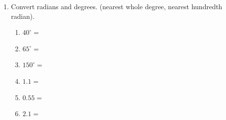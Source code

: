 \documentclass[12pt, twoside]{article}
\begin{document}
\begin{enumerate}
\item Convert radians and degrees. (nearest whole degree, nearest hundredth radian).\vspace{.25cm}
  \begin{multicols}{2}
    \begin{enumerate}
      \item $40^\circ = $ \vspace{1cm}
      \item $65^\circ = $ \vspace{1cm}
      \item $150^\circ = $
      \item $\displaystyle 1.1 =$ \vspace{1cm}
      \item $\displaystyle 0.55 =$ \vspace{1cm}
      \item $\displaystyle 2.1 =$
    \end{enumerate}
  \end{multicols} \vspace{1cm}


\end{enumerate}
\end{document}

